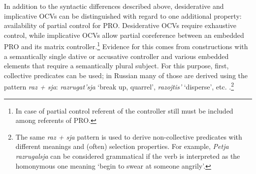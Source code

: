 \documentclass[output=paper,
colorlinks,
citecolor=brown,
newtxmath
]{langscibook}
\begin{document}
\ea\label{ex8} 
\z
\z

\ea\label{ex9}
\z
\z

\noindent In addition to the syntactic differences described above, desiderative and implicative OCVs can be distinguished with regard to one additional property: availability of partial control for PRO. Desiderative OCVs require exhaustive control, while implicative OCVs allow partial coreference between an embedded PRO and its matrix controller.\footnote{In case of partial control referent of the controller still must be included among referents of PRO.} Evidence for this comes from constructions with a semantically single dative or accusative controller and various embedded elements that require a semantically plural subject. For this purpose, first, collective predicates can be used; in Russian many of those are derived using the pattern \textit{raz + sja}: \textit{razrugat’sja} `break up, quarrel’, \textit{razojtis’} `disperse’, etc. .\footnote{The same \textit{raz + sja} pattern is used to derive non-collective predicates with different meanings and (often) selection properties. For example, \textit{Petja razrugalsja} can be considered grammatical if the verb is interpreted as the homonymous one meaning `begin to swear at someone angrily’.} 


\ea\label{ex10}
\z
\z
\end{document}
